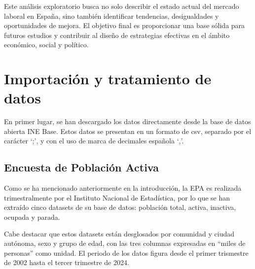 \documentclass[notspecified,article,submit,moreauthors,pdftex]{Definitions/mdpi}
\begin{document}
Este análisis exploratorio busca no solo describir el estado actual del
mercado laboral en España, sino también identificar tendencias,
desigualdades y oportunidades de mejora. El objetivo final es
proporcionar una base sólida para futuros estudios y contribuir al
diseño de estrategias efectivas en el ámbito económico, social y
político.

\section{Importación y tratamiento de
datos}\label{importaciuxf3n-y-tratamiento-de-datos}

En primer lugar, se han descargado los datos directamente desde la base
de datos abierta INE Base. Estos datos se presentan en un formato de
csv, separado por el carácter `;', y con el uso de marca de decimales
española `,'.

\subsection{Encuesta de Población
Activa}\label{encuesta-de-poblaciuxf3n-activa}

Como se ha mencionado anteriormente en la introducción, la EPA es
realizada trimestralmente por el Instituto Nacional de Estadística, por
lo que se han extraído cinco datasets de su base de datos: población
total, activa, inactiva, ocupada y parada.

Cabe destacar que estos datasets están desglosados por comunidad y
ciudad autónoma, sexo y grupo de edad, con las tres columnas expresadas
en ``miles de personas'' como unidad. El periodo de los datos figura
desde el primer trismestre de 2002 hasta el tercer trimestre de 2024.
\end{document}
